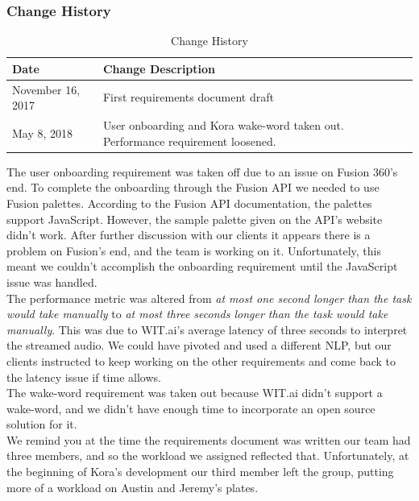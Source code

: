 \documentclass[onecolumn, draftclsnofoot,10pt, compsoc]{IEEEtran}
\newcommand{\newpara}{\\[0.1in]}
\begin{document}
		\subsubsection{Change History}
		\begin{table}[H]
			\centering
			\caption{Change History}
			\label{my-label}
			\begin{tabular}{|l|l|}
				\hline
				\textbf{Date}     & \textbf{Change Description}   \\ \hline
				November 16, 2017 & {First requirements document draft} \\ \hline
				May 8, 2018 & {User onboarding and Kora wake-word taken out. Performance requirement loosened.} \\ \hline
			\end{tabular}
		\end{table}
		
		The user onboarding requirement was taken off due to an issue on Fusion 360's end.
		To complete the onboarding through the Fusion API we needed to use Fusion palettes.
		According to the Fusion API documentation, the palettes support JavaScript. However, the sample palette given on the API's website didn't work.
		After further discussion with our clients it appears there is a problem on Fusion's end, and the team is working on it. 
		Unfortunately, this meant we couldn't accomplish the onboarding requirement until the JavaScript issue was handled.
		\newpara
		The performance metric was altered from \textit{at most one second longer than the task would take manually} to \textit{at most three seconds longer than the task would take manually}.
		This was due to WIT.ai's average latency of three seconds to interpret the streamed audio.
		We could have pivoted and used a different NLP, but our clients instructed to keep working on the other requirements and come back to the latency issue if time allows.
		\newpara
		The wake-word requirement was taken out because WIT.ai didn't support a wake-word, and we didn't have enough time to incorporate an open source solution for it. 
		\newpara
		We remind you at the time the requirements document was written our team had three members, and so the workload we assigned reflected that. Unfortunately, at the beginning of Kora's development our third member left the group, putting more of a workload on Austin and Jeremy's plates.
		
\end{document}
